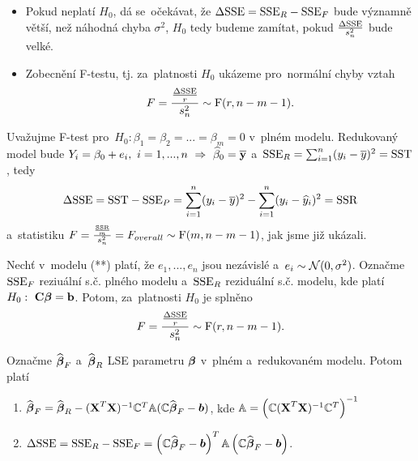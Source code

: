 \begin{itemize}
	\item Pokud neplatí $H_0$, dá se~očekávat, že $\Delta\mathrm{SSE} = \mathrm{SSE}_R-\mathrm{SSE}_F$ bude významně větší, než náhodná chyba $\sigma^2$, $H_0$ tedy budeme zamítat, pokud $\frac{\Delta\mathrm{SSE}}{s_n^2}$ bude velké.
	\item Zobecnění F-testu, tj. za~platnosti $H_0$ ukázeme pro~normální chyby vztah
	 $$ F = \frac{\frac{\Delta\mathrm{SSE}}{r}}{s_n^2}\sim\mathrm{F}(r,n-m-1). $$
\end{itemize}
\begin{example}
	Uvažujme F-test pro~$H_0:\beta_1 = \beta_2 = ... = \beta_m = 0$ v~plném modelu. Redukovaný model bude $Y_i = \beta_0+e_i,~i = 1,...,n~\Rightarrow~\widehat{\beta}_0 = \overline{\textbf{y}}$ a~$\mathrm{SSE}_R = \sum_{i = 1}^n (y_i-\overline{y})^2 = \mathrm{SST}$, tedy
	 $$ \Delta \mathrm{SSE} = \mathrm{SST}-\mathrm{SSE}_P = \sum_{i = 1}^n (y_i-\overline{y})^2-\sum_{i = 1}^n (y_i-\widehat{y}_i)^2 = \mathrm{SSR} $$
	 a~statistiku $F = \frac{\frac{\mathrm{SSR}}{m}}{s_n^2} = F_{overall}\sim\mathrm{F}(m,n-m-1)$, jak jsme již ukázali.
\end{example}
\begin{theorem}
	Nechť v~modelu (**) platí, že $e_1,...,e_n$ jsou nezávislé a~$e_i\sim\mathcal{N}(0,\sigma^2)$. Označme $\mathrm{SSE}_F$ reziuální s.č. plného modelu a~$\mathrm{SSE}_R$ reziduální s.č. modelu, kde platí $H_0:~\textbf{C}\boldsymbol{\beta} = \textbf{b}$. Potom, za~platnosti $H_0$ je splněno
	 $$ F = \frac{\frac{\Delta\mathrm{SSE}}{r}}{s_n^2}\sim\mathrm{F}(r,n-m-1). $$
\end{theorem}\newcommand{\bb}{\boldsymbol{b}}
\newcommand{\yb}{\boldsymbol{y}}
\newcommand{\lambdab}{\boldsymbol{\lambda}}
\newcommand{\xtx}{(\X^T \X)^{-1}}
\newcommand{\parcialni}[2]{\frac{\partial #1}{\partial #2}}

\begin{lemma}
	Označme $\widehat{\boldsymbol{\beta}}_F$ a~$\widehat{\boldsymbol{\beta}}_R$ LSE parametru $\boldsymbol{\beta}$ v~plném a~redukovaném modelu. Potom platí
	\begin{enumerate}
		\item $\wbetab_F = \wbetab_R - (\X^T \X)^{-1} \C^T \Am (\C \wbetab_F - \bb)$, kde $\mathbb{A} = \left(\mathbb{C} (\textbf{X}^T \textbf{X})^{-1} \mathbb{C}^T \right)^{-1}$
		\item $\Delta \SSE = \SSE_R - \SSE_F = \left(\C \wbetab_F - \bb \right)^T \Am \left(\C \wbetab_F - \bb \right)$.
	\end{enumerate}
\end{lemma}

